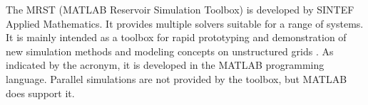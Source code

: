The MRST (MATLAB Reservoir Simulation Toolbox) is developed by SINTEF Applied Mathematics. It provides multiple solvers suitable for a range of systems. It is mainly intended as a toolbox for rapid prototyping and demonstration of new simulation methods and modeling concepts on unstructured grids \cite{Sintef2014Sintef}. As indicated by the acronym, it is developed in the MATLAB programming language. Parallel simulations are not provided by the toolbox, but MATLAB does support it.


